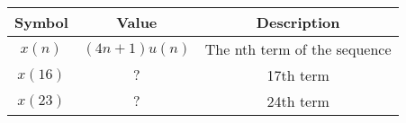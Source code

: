 
    \begin{tabular}{|c|c|c|}
    \hline
     \textbf{Symbol} & \textbf{Value} &
     \textbf{Description}\\
    \hline
     $x(n)$ &  $(4n+1)u(n)$ & The nth term of the sequence\\[6pt]
    \hline 
     $x(16)$ &  $?$ & 17th term \\[6pt]
    \hline
     $x(23)$ &  $?$ & 24th term\\[6pt]
    \hline
     
\end{tabular}
